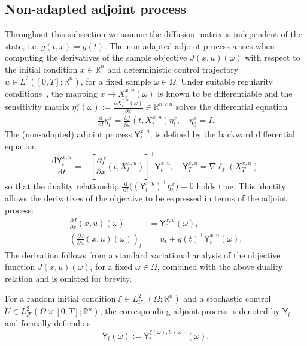 \documentclass[letterpaper, 10 pt, conference]{ieeeconf}  %
\def\Re{\mathbb{R}}
\newcommand{\field}[1]{\mathbb{#1}}
\def\Re{\field{R}}
\newcommand{\ud}{\,\mathrm{d}}
\def\Re{\mathbb{R}}
\renewcommand{\Re}{\mathbb{R}}
\newcommand{\Yn}{\mathsf Y}
\begin{document}
\subsection{Non-adapted adjoint process}
Throughout this subsection we assume the diffusion matrix is independent of the state, i.e.
$
g(t,x)=g(t)
$.
The non-adapted adjoint process arises when computing the derivatives of the sample objective  $J(x,u)(\omega)$ with respect to the initial condition $x \in \Re^n$ and deterministic control trajectory $u \in L^2([0,T];\Re^n)$, for a fixed sample $\omega \in \Omega$. Under suitable regularity conditions~\cite[Ch. V, Thm. 39]{protter2005stochastic}, the mapping $x \to X^{x,u}_t(\omega)$ is known to be differentiable  and the sensitivity matrix $ \eta^x_t(\omega):=\frac{\partial X^{x,u}_t(\omega)}{\partial x} \in \Re^{n\times n}$ solves the differential equation
    \begin{align*}
        \frac{\ud}{\ud t} \eta^x_t = \frac{\partial f}{\partial x}(t,X^{x,u}_t) \eta^{x}_t ,\quad \eta^x_0 =  I. 
    \end{align*}
The (non-adapted) adjoint process $\Yn^{x,u}_t$, is defined by the backward differential equation
\begin{equation}\label{eq:non-ad}
\frac{\ud \Yn^{x,u}_t}{\ud t} =  - [\frac{\partial f}{\partial x}(t,X^{x,u}_t)]^\top \Yn^{x,u}_t ,\quad \Yn^{x,u}_T = \nabla \ell_f(X^{x,u}_T). 
\end{equation}
so that the duality relationship
    $
        \frac{\ud}{\ud t} \big( (\Yn^{x,y}_t)^\top \eta^x_t \big) = 0 
    $
    holds true. 
 This identity allows the derivatives of the objective to be expressed in terms of the adjoint process:
     \begin{align*}
\frac{\partial J}{\partial x} (x,u)(\omega) &= \Yn^{x,u}_0(\omega),\\
\left(\frac{\partial J}{\partial u} (x,u)(\omega)\right)_t &= u_t + g(t)^\top  \Yn^{x,u}_t(\omega).
\end{align*}
The derivation follows from a standard variational analysis of the objective function $J(x,u)(\omega)$, for a fixed $\omega \in \Omega$, combined with the above duality relation and is omitted for brevity. 

 For a random initial condition $\xi \in L^2_{\mathcal F_0}(\Omega;\Re^n)$ and a stochastic control $U \in L^2_{\mathcal F}(\Omega \times [0,T];\Re^n)$, the corresponding adjoint process is denoted by $\Yn_t$ and formally defiend as 
\[\Yn_t(\omega):=\Yn^{\xi(\omega),U(\omega)}_t(\omega).\] 
\end{document}
